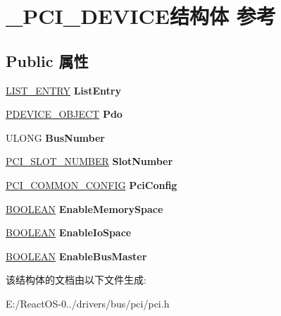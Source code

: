 \hypertarget{struct___p_c_i___d_e_v_i_c_e}{}\section{\+\_\+\+P\+C\+I\+\_\+\+D\+E\+V\+I\+C\+E结构体 参考}
\label{struct___p_c_i___d_e_v_i_c_e}
\subsection*{Public 属性}
\begin{DoxyCompactItemize}
\item 
\mbox{\label{struct___p_c_i___d_e_v_i_c_e_a1781dea5539cebe53c3f4381349e5bc3}} 
\hyperlink{struct___l_i_s_t___e_n_t_r_y}{L\+I\+S\+T\+\_\+\+E\+N\+T\+RY} {\bfseries List\+Entry}
\item 
\mbox{\label{struct___p_c_i___d_e_v_i_c_e_a835b3e1b8cf250a5afa214067d32313f}} 
\hyperlink{struct___d_e_v_i_c_e___o_b_j_e_c_t}{P\+D\+E\+V\+I\+C\+E\+\_\+\+O\+B\+J\+E\+CT} {\bfseries Pdo}
\item 
\mbox{\label{struct___p_c_i___d_e_v_i_c_e_afe919c62b2113ed0a6c163d55b4d9123}} 
U\+L\+O\+NG {\bfseries Bus\+Number}
\item 
\mbox{\label{struct___p_c_i___d_e_v_i_c_e_a12db0b4cfbe2308095a35f370c965749}} 
\hyperlink{struct___p_c_i___s_l_o_t___n_u_m_b_e_r}{P\+C\+I\+\_\+\+S\+L\+O\+T\+\_\+\+N\+U\+M\+B\+ER} {\bfseries Slot\+Number}
\item 
\mbox{\label{struct___p_c_i___d_e_v_i_c_e_a7cca9e98b440c142467724317bce32ee}} 
\hyperlink{struct___p_c_i___c_o_m_m_o_n___c_o_n_f_i_g}{P\+C\+I\+\_\+\+C\+O\+M\+M\+O\+N\+\_\+\+C\+O\+N\+F\+IG} {\bfseries Pci\+Config}
\item 
\mbox{\label{struct___p_c_i___d_e_v_i_c_e_a2947bb497dcb42120fb83cfdf78400bf}} 
\hyperlink{_processor_bind_8h_a112e3146cb38b6ee95e64d85842e380a}{B\+O\+O\+L\+E\+AN} {\bfseries Enable\+Memory\+Space}
\item 
\mbox{\label{struct___p_c_i___d_e_v_i_c_e_a1b5eb98436b0668cf31f4b7ac6358ada}} 
\hyperlink{_processor_bind_8h_a112e3146cb38b6ee95e64d85842e380a}{B\+O\+O\+L\+E\+AN} {\bfseries Enable\+Io\+Space}
\item 
\mbox{\label{struct___p_c_i___d_e_v_i_c_e_afd5081c0f95f5e1ef1fa4e88f113b9ae}} 
\hyperlink{_processor_bind_8h_a112e3146cb38b6ee95e64d85842e380a}{B\+O\+O\+L\+E\+AN} {\bfseries Enable\+Bus\+Master}
\end{DoxyCompactItemize}


该结构体的文档由以下文件生成\+:\begin{DoxyCompactItemize}
\item 
E\+:/\+React\+O\+S-\/0../drivers/bus/pci/pci.\+h\end{DoxyCompactItemize}
